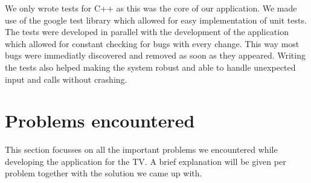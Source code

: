 We only wrote tests for C++ as this was the core of our application. We made use of the google test library which allowed for easy implementation of unit tests. The tests were developed in parallel with the development of the application which allowed for constant checking for bugs with every change. This way most bugs were immediatly discovered and removed as soon as they appeared. Writing the tests also helped making the system robust and able to handle unexpected input and calls without crashing. 

\section{Problems encountered}
This section focusses on all the important problems we encountered while developing the application for the TV.
A brief explanation will be given per problem together with the solution we came up with.

